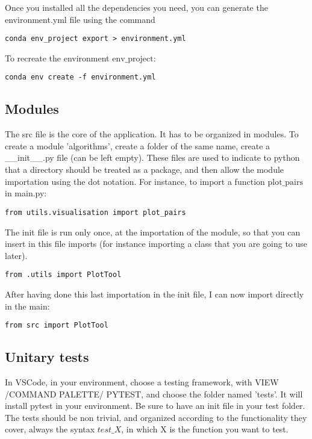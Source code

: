 \documentclass[24pt]{article}
\begin{document}
Once you installed all the dependencies you need, you can generate
the environment.yml file using the command

\begin{lstlisting}
conda env_project export > environment.yml
\end{lstlisting}

To recreate the environment $\text{env\_project}$:


\begin{lstlisting}
conda env create -f environment.yml
\end{lstlisting}

\subsection{Modules}

The src file is the core of the application. It has to be organized in modules. To create a module 'algorithms', create a folder of the same name, create a \_\_init\_\_.py file (can be left empty). These files are used to indicate to  python that a directory should be treated as a package, and then allow the module importation using the dot notation. For instance, to  import a function $\text{plot\_pairs}$ in main.py: 

\begin{lstlisting}
from utils.visualisation import plot_pairs
\end{lstlisting}

The init file is run only once, at the importation of the module, so that you can insert in this file imports (for instance importing a class that you are going to use later).

\begin{lstlisting}
from .utils import PlotTool
\end{lstlisting}

After having done this last importation in the init file, I can now import directly in the main:

\begin{lstlisting}
from src import PlotTool
\end{lstlisting}



\subsection{Unitary tests}

In VSCode, in your environment, choose a testing framework, with VIEW /COMMAND PALETTE/ PYTEST, and choose the folder named 'tests'. It will install
pytest in your environment. Be sure to have an init file in your test folder.
The tests should be non trivial, and organized according to the functionality they cover, always the syntax $test\_X$, in which X is the function you want to test.
\end{document}
